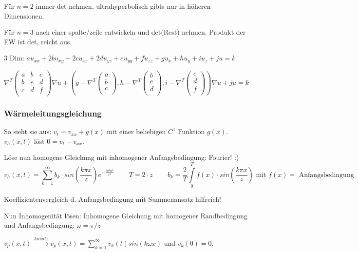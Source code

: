 \documentclass[10pt,a4paper]{article}
\begin{document}
Für $n=2$ immer det nehmen, ultrahyperbolisch gibts nur in höheren Dimensionen.

Für $n=3$ nach einer spalte/zeile entwickeln und det(Rest) nehmen. Produkt der EW ist det, reicht aus.

3 Dim: $au_{xx}+2bu_{xy}+2cu_{xz}+2du_{yz}+eu_{yy}+fu_{zz}+gu_x +hu_y+iu_z+ju=k$

$\nabla^T
\begin{pmatrix}
a & b&c \\
b & e&d \\
c&d&f\\
\end{pmatrix}
\nabla u+\left(g - \nabla^T \begin{pmatrix}
a\\b\\c\\
\end{pmatrix}, h - \nabla^T \begin{pmatrix}
b\\e\\d\\
\end{pmatrix},i - \nabla^T \begin{pmatrix}
e\\d\\f\\
\end{pmatrix}\right)\nabla u + ju = k$

\subsubsection{Wärmeleitungsgleichung}
So sieht sie aus: $v_t = v_{xx} + g(x)$ mit einer beliebigen $C^1$ Funktion $g(x)$. $v_h(x,t)$ löst $0 = v_t - v_{xx}$.

Löse nun homogene Gleichung mit inhomogener Anfangsbedingung: Fourier! :)
\[v_h(x,t) = \sum\limits_{k=1}^{\infty} b_k \cdot sin\left(\frac{k \pi x}{z} \right) e^{-\frac{t k^2 \pi^2}{z^2}}
\,\,\,\,\,\,\,\,\,\,\,\,\,
T=2\cdot z
\,\,\,\,\,\,\,\,\,\,\,\,\,
b_k = \frac{2}{T} \int\limits_0^T f(x) \cdot sin\left( \frac{k \pi x}{z}\right) \mbox{ mit } f(x) = \mbox{ Anfangsbedingung}
\]

Koeffizientenvergleich d. Anfangsbedingung mit Summenansatz hilfreich!

Nun Inhomogenität lösen: Inhomogene Gleichung mit homogener Randbedingung und Anfangsbedingung: $\omega = \pi / z$

$v_p(x,t) \xrightarrow{Ansatz} v_p(x,t) = \sum\limits_{k=1}^{\infty} v_k(t) sin \left( k \omega x \right)$ und $v_k(0) = 0$.
\end{document}
